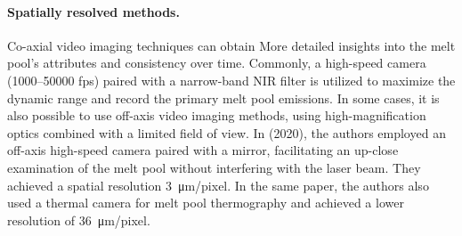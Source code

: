 \paragraph{Spatially resolved methods.} Co-axial video imaging techniques can obtain More detailed insights into the melt pool's attributes and consistency over time. Commonly, a high-speed camera (\numrange{1000}{50000} \unit{fps}) paired with a narrow-band NIR filter is utilized to maximize the dynamic range and record the primary melt pool emissions. In some cases, it is also possible to use off-axis video imaging methods, using high-magnification optics combined with a limited field of view. In \citeauthor{lane_measurements_2020} (2020), the authors employed an off-axis high-speed camera paired with a mirror, facilitating an up-close examination of the melt pool without interfering with the laser beam. They achieved a spatial resolution \SI{3}{\micro\metre / pixel}. In the same paper, the authors also used a thermal camera for melt pool thermography and achieved a lower resolution of \SI{36}{\micro \metre / pixel}.
